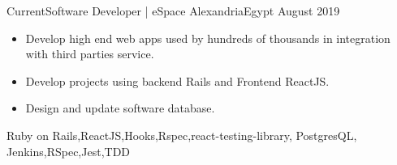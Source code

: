 \begin{experiences}
  \experience
    {Current}{Software Developer | eSpace }{Alexandria}{Egypt}
    {August 2019}   {
                      \begin{itemize}
                        \item Develop high end web apps used by hundreds of thousands in integration with third parties service.
                        \item Develop projects using backend Rails and Frontend ReactJS.
                        \item Design and update software database.
                      \end{itemize}
                    }
                    {Ruby on Rails,ReactJS,Hooks,Rspec,react-testing-library, PostgresQL, Jenkins,RSpec,Jest,TDD}                    
\end{experiences}
